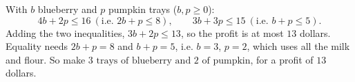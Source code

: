 With $b$ blueberry and $p$ pumpkin trays ($b,p\ge0$):
\[4b+2p\le16\ (\text{i.e. }2b+p\le8),\qquad 3b+3p\le15\ (\text{i.e. }b+p\le5).\]
Adding the two inequalities, $3b+2p\le13$, so the profit is at most $13$ dollars. Equality needs $2b+p=8$ and $b+p=5$, i.e. $b=3$, $p=2$, which uses all the milk and flour. So make $\boxed{3\text{ trays of blueberry and }2\text{ of pumpkin}}$, for a profit of $13$ dollars.
